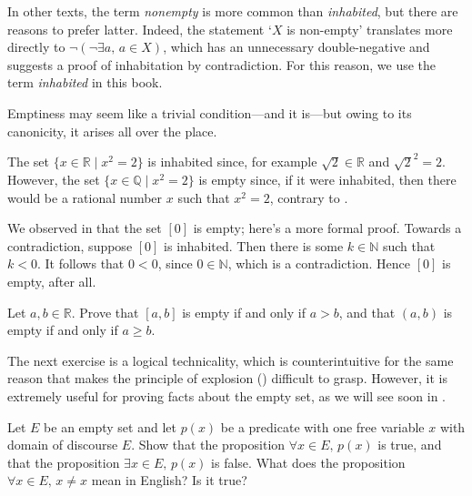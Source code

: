 In other texts, the term \textit{nonempty} is more common than \textit{inhabited}, but there are reasons to prefer latter. Indeed, the statement `$X$ is non-empty' translates more directly to $\neg(\neg \exists a,\, a \in X)$, which has an unnecessary double-negative and suggests a proof of inhabitation by contradiction. For this reason, we use the term \textit{inhabited} in this book.

Emptiness may seem like a trivial condition---and it is---but owing to its canonicity, it arises all over the place.

\begin{example}
The set $\{ x \in \mathbb{R} \mid x^2 = 2 \}$ is inhabited since, for example $\sqrt{2} \in \mathbb{R}$ and $\sqrt{2}^2 = 2$. However, the set $\{ x \in \mathbb{Q} \mid x^2 = 2 \}$ is empty since, if it were inhabited, then there would be a rational number $x$ such that $x^2 = 2$, contrary to .
\end{example}

\begin{example}
We observed in  that the set $[0]$ is empty; here's a more formal proof. Towards a contradiction, suppose $[0]$ is inhabited. Then there is some $k \in \mathbb{N}$ such that $k < 0$. It follows that $0 < 0$, since $0 \in \mathbb{N}$, which is a contradiction. Hence $[0]$ is empty, after all.
\end{example}

\begin{exercise}
Let $a,b \in \mathbb{R}$. Prove that $[a,b]$ is empty if and only if $a > b$, and that $(a,b)$ is empty if and only if $a \ge b$.
\end{exercise}

The next exercise is a logical technicality, which is counterintuitive for the same reason that makes the principle of explosion () difficult to grasp. However, it is extremely useful for proving facts about the empty set, as we will see soon in .

\begin{exercise}
Let $E$ be an empty set and let $p(x)$ be a predicate with one free variable $x$ with domain of discourse $E$. Show that the proposition $\forall x \in E,\, p(x)$ is true, and that the proposition $\exists x \in E,\, p(x)$ is false. What does the proposition $\forall x \in E,\, x \ne x$ mean in English? Is it true?
\end{exercise}

